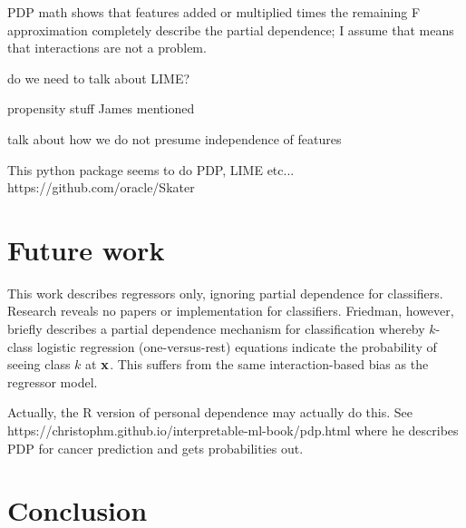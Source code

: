 \documentclass[12pt]{article}
\begin{document}
PDP math shows that features added or multiplied times the remaining F approximation completely describe the partial dependence; I assume that means that interactions are not a problem.

do we need to talk about LIME?

propensity stuff James mentioned

talk about how we do not presume independence of features
 
This python package seems to do PDP, LIME etc... https://github.com/oracle/Skater

\section{Future work}

This work describes regressors only, ignoring partial dependence for classifiers.  Research reveals no papers or implementation for classifiers. Friedman, however, briefly describes a partial dependence mechanism for classification whereby $k$-class logistic regression (one-versus-rest) equations indicate the probability of seeing class $k$ at $\bf{x}$.  This suffers from the same interaction-based bias as the regressor model.

Actually, the R version of personal dependence may actually do this. See https://christophm.github.io/interpretable-ml-book/pdp.html where he describes PDP for cancer prediction and gets probabilities out.

\section{Conclusion}
\label{sec:conc}




\end{document}
